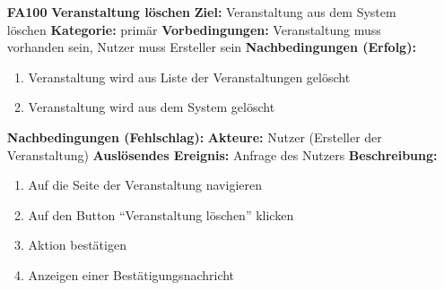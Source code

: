 \documentclass[parskip=full]{scrartcl}
\begin{document}
\begin{itemize}[nosep]
			\item[\textbf{FA100}]\textbf{Veranstaltung löschen}
				\newline \textbf{Ziel:} Veranstaltung aus dem System löschen
				\newline \textbf{Kategorie:} primär
				\newline \textbf{Vorbedingungen:} Veranstaltung muss vorhanden sein, Nutzer muss Ersteller sein
				\newline \textbf{Nachbedingungen (Erfolg):} 
				\begin{enumerate}[nosep]
					\item Veranstaltung wird aus Liste der Veranstaltungen gelöscht
					\item Veranstaltung wird aus dem System gelöscht
				\end{enumerate}
				\textbf{Nachbedingungen (Fehlschlag):}
				\newline \textbf{Akteure:}  Nutzer (Ersteller der Veranstaltung)
				\newline \textbf{Auslösendes Ereignis:} Anfrage des Nutzers
				\newline \textbf{Beschreibung:}
				\begin{enumerate}[nosep]
					\item Auf die Seite der Veranstaltung navigieren
					\item Auf den Button “Veranstaltung löschen” klicken
					\item Aktion bestätigen
					\item Anzeigen einer Bestätigungsnachricht\\
				\end{enumerate}
			

\end{itemize}
\end{document}
